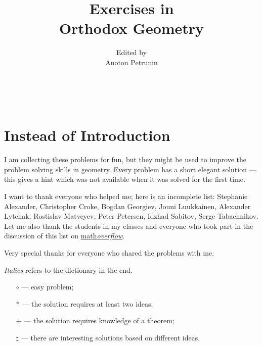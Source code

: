 \documentclass[twoside]{book}
\begin{document}
\title{Exercises in \\
Orthodox Geometry}
\author{Edited by\\
 Anoton Petrunin}

\date{}
\maketitle



\null\vfill{}

\ 

\thispagestyle{empty}

\tableofcontents

\newpage

\section*{Instead of Introduction}

I am collecting these problems for fun, 
but they might be used to improve 
the problem solving skills in geometry.
Every problem has a short elegant solution ---
this gives a hint which was not available
when it was solved for the first time.


I want to thank everyone who helped me;
here is an incomplete list:
Stephanie Alexander,
Christopher Croke,
Bogdan Georgiev,
Jouni Luukkainen,
Alexander Lytchak,
Rostislav Matve\-yev, 
Peter Petersen, 
Idzhad Sabitov,
Serge Tabachnikov.
Let me also thank  the students in my classes 
and everyone who took part in the discussion of this list 
on \href{http://mathoverflow.net/questions/8247}{math\textit{overflow}}.

Very special thanks for everyone who shared the problems with me.

\vfill

\emph{Italics} refers to the dictionary in the end.  
\begin{itemize}
\item[$\circ$] --- easy problem;%
\item[$*$] --- the solution requires at least two ideas;%
\item[{\small$+$}] --- the solution requires knowledge of a theorem;%
\item[$\sharp$] --- there are interesting solutions based on different ideas.%
\end{itemize}
\end{document}
